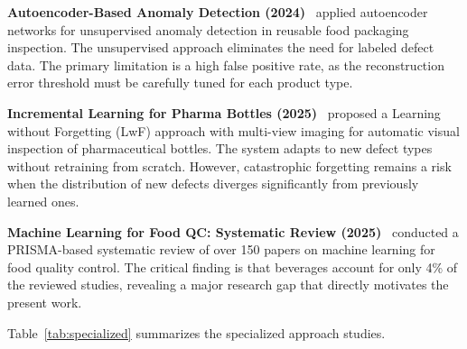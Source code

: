 \documentclass{ieeeaccess}
\begin{document}
\textbf{Autoencoder-Based Anomaly Detection (2024)}~\cite{autoencoder2024} applied autoencoder networks for unsupervised anomaly detection in reusable food packaging inspection. The unsupervised approach eliminates the need for labeled defect data. The primary limitation is a high false positive rate, as the reconstruction error threshold must be carefully tuned for each product type.

\textbf{Incremental Learning for Pharma Bottles (2025)}~\cite{pharma2025} proposed a Learning without Forgetting (LwF) approach with multi-view imaging for automatic visual inspection of pharmaceutical bottles. The system adapts to new defect types without retraining from scratch. However, catastrophic forgetting remains a risk when the distribution of new defects diverges significantly from previously learned ones.

\textbf{Machine Learning for Food QC: Systematic Review (2025)}~\cite{mlreview2025} conducted a PRISMA-based systematic review of over 150 papers on machine learning for food quality control. The critical finding is that beverages account for only 4\% of the reviewed studies, revealing a major research gap that directly motivates the present work.

Table~\ref{tab:specialized} summarizes the specialized approach studies.

\begin{table}[!t]
\caption{Summary of Specialized Approach Studies}
\label{tab:specialized}
\centering
\small
{}
\end{table}


\end{document}
